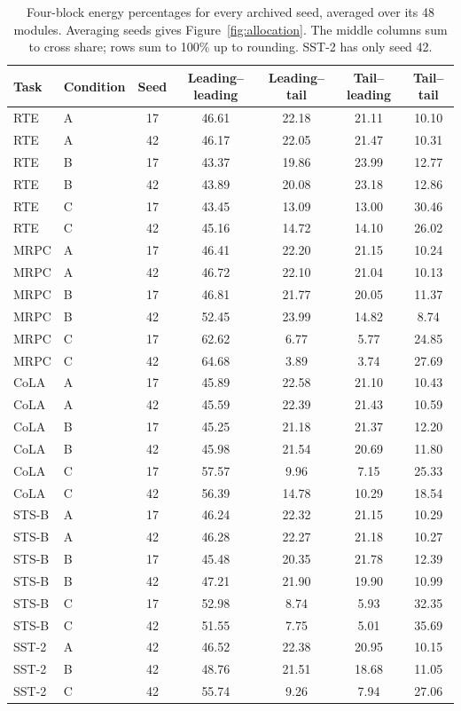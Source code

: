 \documentclass{article}
\begin{document}
\begin{table}[ht]
\centering
\caption{Four-block energy percentages for every archived seed, averaged over its 48 modules. Averaging seeds gives Figure~\ref{fig:allocation}. The middle columns sum to cross share; rows sum to 100\% up to rounding. SST-2 has only seed 42.}
\label{tab:blockallocation}
\begin{tabular}{llccccc}
\toprule
Task & Condition & Seed & Leading--leading & Leading--tail & Tail--leading & Tail--tail\\
\midrule
RTE & A & 17 & 46.61 & 22.18 & 21.11 & 10.10 \\
RTE & A & 42 & 46.17 & 22.05 & 21.47 & 10.31 \\
RTE & B & 17 & 43.37 & 19.86 & 23.99 & 12.77 \\
RTE & B & 42 & 43.89 & 20.08 & 23.18 & 12.86 \\
RTE & C & 17 & 43.45 & 13.09 & 13.00 & 30.46 \\
RTE & C & 42 & 45.16 & 14.72 & 14.10 & 26.02 \\
\midrule
MRPC & A & 17 & 46.41 & 22.20 & 21.15 & 10.24 \\
MRPC & A & 42 & 46.72 & 22.10 & 21.04 & 10.13 \\
MRPC & B & 17 & 46.81 & 21.77 & 20.05 & 11.37 \\
MRPC & B & 42 & 52.45 & 23.99 & 14.82 & 8.74 \\
MRPC & C & 17 & 62.62 & 6.77 & 5.77 & 24.85 \\
MRPC & C & 42 & 64.68 & 3.89 & 3.74 & 27.69 \\
\midrule
CoLA & A & 17 & 45.89 & 22.58 & 21.10 & 10.43 \\
CoLA & A & 42 & 45.59 & 22.39 & 21.43 & 10.59 \\
CoLA & B & 17 & 45.25 & 21.18 & 21.37 & 12.20 \\
CoLA & B & 42 & 45.98 & 21.54 & 20.69 & 11.80 \\
CoLA & C & 17 & 57.57 & 9.96 & 7.15 & 25.33 \\
CoLA & C & 42 & 56.39 & 14.78 & 10.29 & 18.54 \\
\midrule
STS-B & A & 17 & 46.24 & 22.32 & 21.15 & 10.29 \\
STS-B & A & 42 & 46.28 & 22.27 & 21.18 & 10.27 \\
STS-B & B & 17 & 45.48 & 20.35 & 21.78 & 12.39 \\
STS-B & B & 42 & 47.21 & 21.90 & 19.90 & 10.99 \\
STS-B & C & 17 & 52.98 & 8.74 & 5.93 & 32.35 \\
STS-B & C & 42 & 51.55 & 7.75 & 5.01 & 35.69 \\
\midrule
SST-2 & A & 42 & 46.52 & 22.38 & 20.95 & 10.15 \\
SST-2 & B & 42 & 48.76 & 21.51 & 18.68 & 11.05 \\
SST-2 & C & 42 & 55.74 & 9.26 & 7.94 & 27.06 \\
\bottomrule
\end{tabular}
\end{table}
\end{document}
